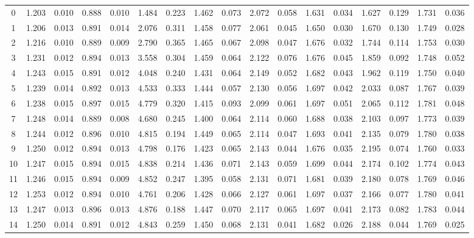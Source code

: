 \documentclass{article}
\begin{document}
\begin{table}[H]
{\begin{tabular}{|c|c|c|c|c|c|c|c|c|c|c|c|c|c|c|c|c|}
   0 & 1.203 & 0.010 & 0.888 & 0.010 & 1.484 & 0.223 & 1.462 & 0.073 & 2.072 & 0.058 & 1.631 & 0.034 & 1.627 & 0.129 & 1.731 & 0.036 \\ 
     1 & 1.206 & 0.013 & 0.891 & 0.014 & 2.076 & 0.311 & 1.458 & 0.077 & 2.061 & 0.045 & 1.650 & 0.030 & 1.670 & 0.130 & 1.749 & 0.028 \\ 
     2 & 1.216 & 0.010 & 0.889 & 0.009 & 2.790 & 0.365 & 1.465 & 0.067 & 2.098 & 0.047 & 1.676 & 0.032 & 1.744 & 0.114 & 1.753 & 0.030 \\ 
     3 & 1.231 & 0.012 & 0.894 & 0.013 & 3.558 & 0.304 & 1.459 & 0.064 & 2.122 & 0.076 & 1.676 & 0.045 & 1.859 & 0.092 & 1.748 & 0.052 \\ 
     4 & 1.243 & 0.015 & 0.891 & 0.012 & 4.048 & 0.240 & 1.431 & 0.064 & 2.149 & 0.052 & 1.682 & 0.043 & 1.962 & 0.119 & 1.750 & 0.040 \\ 
     5 & 1.239 & 0.014 & 0.892 & 0.013 & 4.533 & 0.333 & 1.444 & 0.057 & 2.130 & 0.056 & 1.697 & 0.042 & 2.033 & 0.087 & 1.767 & 0.039 \\ 
     6 & 1.238 & 0.015 & 0.897 & 0.015 & 4.779 & 0.320 & 1.415 & 0.093 & 2.099 & 0.061 & 1.697 & 0.051 & 2.065 & 0.112 & 1.781 & 0.048 \\ 
     7 & 1.248 & 0.014 & 0.889 & 0.008 & 4.680 & 0.245 & 1.400 & 0.064 & 2.114 & 0.060 & 1.688 & 0.038 & 2.103 & 0.097 & 1.773 & 0.039 \\ 
     8 & 1.244 & 0.012 & 0.896 & 0.010 & 4.815 & 0.194 & 1.449 & 0.065 & 2.114 & 0.047 & 1.693 & 0.041 & 2.135 & 0.079 & 1.780 & 0.038 \\ 
     9 & 1.250 & 0.012 & 0.894 & 0.013 & 4.798 & 0.176 & 1.423 & 0.065 & 2.143 & 0.044 & 1.676 & 0.035 & 2.195 & 0.074 & 1.760 & 0.033 \\ 
    10 & 1.247 & 0.015 & 0.894 & 0.015 & 4.838 & 0.214 & 1.436 & 0.071 & 2.143 & 0.059 & 1.699 & 0.044 & 2.174 & 0.102 & 1.774 & 0.043 \\ 
    11 & 1.246 & 0.015 & 0.894 & 0.009 & 4.852 & 0.247 & 1.395 & 0.058 & 2.131 & 0.071 & 1.681 & 0.039 & 2.180 & 0.078 & 1.769 & 0.046 \\ 
    12 & 1.253 & 0.012 & 0.894 & 0.010 & 4.761 & 0.206 & 1.428 & 0.066 & 2.127 & 0.061 & 1.697 & 0.037 & 2.166 & 0.077 & 1.780 & 0.041 \\ 
    13 & 1.247 & 0.013 & 0.896 & 0.013 & 4.876 & 0.188 & 1.447 & 0.070 & 2.117 & 0.065 & 1.697 & 0.041 & 2.173 & 0.082 & 1.783 & 0.044 \\ 
    14 & 1.250 & 0.014 & 0.891 & 0.012 & 4.843 & 0.259 & 1.450 & 0.068 & 2.131 & 0.041 & 1.682 & 0.026 & 2.188 & 0.044 & 1.769 & 0.025 \\ 

\end{tabular}}
\end{table}
\end{document}
